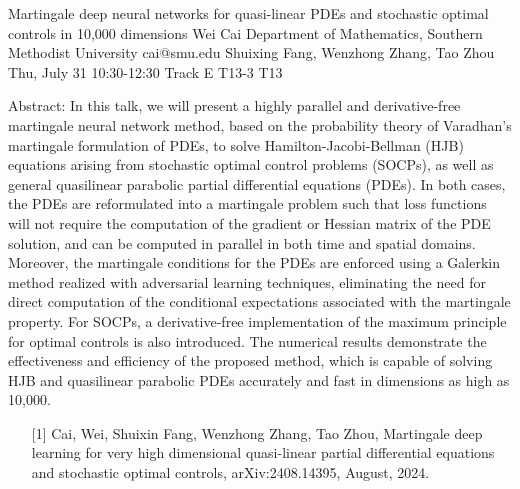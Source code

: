 \begin{talk}
  {Martingale deep neural networks for quasi-linear PDEs and stochastic optimal controls in 10,000 dimensions}%
  {Wei Cai}%
  {Department of Mathematics, Southern Methodist University}%
  {cai@smu.edu}%
  {Shuixing Fang, Wenzhong Zhang, Tao Zhou}%
  {}%
  {Thu, July 31 10:30-12:30 Track E}%
  {T13-3}%
  {T13}%
  
				
			
Abstract: In this talk, we will present a highly parallel and derivative-free martingale neural network method, based on the probability theory of Varadhan’s martingale formulation of PDEs, to solve Hamilton-Jacobi-Bellman (HJB) equations arising from stochastic optimal control problems (SOCPs), as well as general quasilinear parabolic partial differential equations (PDEs). In both cases, the PDEs are reformulated into a martingale problem such that loss functions will not require the computation of the gradient or Hessian matrix of the PDE solution, and can be computed in parallel in both time and spatial domains. Moreover, the martingale conditions for the PDEs are enforced using a Galerkin method realized with adversarial learning techniques, eliminating the need for direct computation of the conditional expectations associated with the martingale property. For SOCPs, a derivative-free implementation of the maximum principle for optimal controls is also introduced. The numerical results demonstrate the effectiveness and efficiency of the proposed method, which is capable of solving HJB and quasilinear parabolic PDEs accurately and fast in dimensions as high as 10,000.

\medskip

\begin{enumerate}
	\item[{[1]}] Cai,  Wei, Shuixin Fang, Wenzhong Zhang, Tao Zhou, Martingale deep learning for very high dimensional quasi-linear partial differential equations and stochastic optimal controls,  arXiv:2408.14395, August, 2024. 
\end{enumerate}

 
\end{talk}

